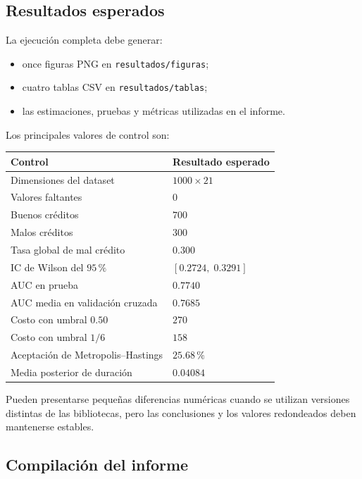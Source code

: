 \subsection{Resultados esperados}

La ejecución completa debe generar:

\begin{itemize}
    \item once figuras PNG en \texttt{resultados/figuras};
    \item cuatro tablas CSV en \texttt{resultados/tablas};
    \item las estimaciones, pruebas y métricas utilizadas en el informe.
\end{itemize}

Los principales valores de control son:

\begin{center}
\begin{tabular}{p{7.2cm}p{3.6cm}}
\toprule
Control & Resultado esperado \\
\midrule
Dimensiones del dataset & \(1000\times21\) \\
Valores faltantes & \(0\) \\
Buenos créditos & \(700\) \\
Malos créditos & \(300\) \\
Tasa global de mal crédito & \(0.300\) \\
IC de Wilson del \(95\,\%\) & \([0.2724,\;0.3291]\) \\
AUC en prueba & \(0.7740\) \\
AUC media en validación cruzada & \(0.7685\) \\
Costo con umbral \(0.50\) & \(270\) \\
Costo con umbral \(1/6\) & \(158\) \\
Aceptación de Metropolis--Hastings & \(25.68\,\%\) \\
Media posterior de duración & \(0.04084\) \\
\bottomrule
\end{tabular}
\end{center}

Pueden presentarse pequeñas diferencias numéricas cuando se utilizan
versiones distintas de las bibliotecas, pero las conclusiones y los valores
redondeados deben mantenerse estables.

\subsection{Compilación del informe}


